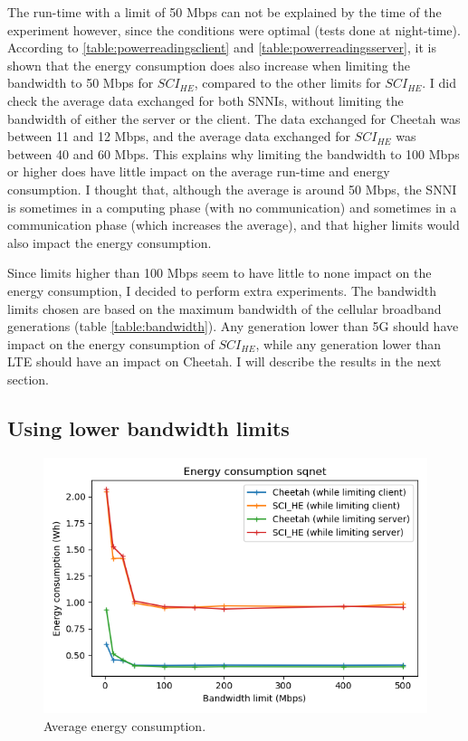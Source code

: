 \documentclass[../thesis.tex]{subfiles}
\begin{document}
The run-time with a limit of 50 Mbps can not be explained by the time of the experiment however, since the conditions were optimal (tests done at night-time). According to \autoref{table:powerreadingsclient} and \autoref{table:powerreadingsserver}, it is shown that the energy consumption does also increase when limiting the bandwidth to 50 Mbps for $SCI_{HE}$, compared to the other limits for $SCI_{HE}$. I did check the average data exchanged for both SNNIs, without limiting the bandwidth of either the server or the client. The data exchanged for Cheetah was between 11 and 12 Mbps, and the average data exchanged for $SCI_{HE}$ was between 40 and 60 Mbps. This explains why limiting the bandwidth to 100 Mbps or higher does have little impact on the average run-time and energy consumption. I thought that, although the average is around 50 Mbps, the SNNI is sometimes in a computing phase (with no communication) and sometimes in a communication phase (which increases the average), and that higher limits would also impact the energy consumption.  

Since limits higher than 100 Mbps seem to have little to none impact on the energy consumption, I decided to perform extra experiments. The bandwidth limits chosen are based on the maximum bandwidth of the cellular broadband generations (table \ref{table:bandwidth}). Any generation lower than 5G should have impact on the energy consumption of $SCI_{HE}$, while any generation lower than LTE should have an impact on Cheetah. I will describe the results in the next section. 
\endgroup
\subsection{Using lower bandwidth limits}
\begingroup
    \setlength{\intextsep}{0pt}
    \setlength{\columnsep}{0pt}
    \begin{figure}
        \centering
        \includegraphics[width=\linewidth]{Thesis/Images/graph_means.png}
        \caption{Average energy consumption.}
        \label{fig:avg_energy}
    \end{figure}
    
\end{document}
